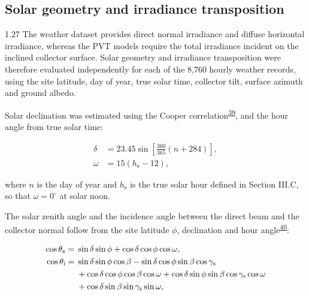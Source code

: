 \documentclass[12pt,letterpaper]{article}
\newcommand{\done}{\ \textcolor{green!45!black}{$\checkmark$}} %
\DeclareRobustCommand{\citenum}[1]{\hyperlink{ref:#1}{#1}} %
\begin{document}
\subsection[Solar geometry and irradiance transposition\done]{Solar geometry and irradiance transposition}\label{sec21}

\begin{spacing}{1.27}
The weather dataset provides direct normal irradiance and diffuse horizontal irradiance, whereas the PVT models require the total irradiance incident on the inclined collector surface. Solar geometry and irradiance transposition were therefore evaluated independently for each of the 8,760 hourly weather records, using the site latitude, day of year, true solar time, collector tilt, surface azimuth and ground albedo.\par

\vspace{0.15in}

Solar declination was estimated using the Cooper correlation\textsuperscript{\citenum{39}}, and the hour angle from true solar time:

\begin{align}
\delta &= 23.45 \sin\left[\frac{360}{365}\left(n+284\right)\right], \label{eq:declination}\\
\omega &= 15\left(h_{\mathrm{s}}-12\right), \label{eq:hourangle}
\end{align}

\noindent where $n$ is the day of year and $h_{\mathrm{s}}$ is the true solar hour defined in Section III.C, so that $\omega=0^\circ$ at solar noon.\par

\vspace{0.15in}

The solar zenith angle and the incidence angle between the direct beam and the collector normal follow from the site latitude $\phi$, declination and hour angle\textsuperscript{\citenum{40}}:

\begin{align}
\cos\theta_{\mathrm{z}} ={}& \sin\delta\sin\phi + \cos\delta\cos\phi\cos\omega, \label{eq:zenith}\\
\cos\theta_{\mathrm{i}} ={}& \sin\delta\sin\phi\cos\beta -\sin\delta\cos\phi\sin\beta\cos\gamma_{\mathrm{s}} \notag\\
&+\cos\delta\cos\phi\cos\beta\cos\omega +\cos\delta\sin\phi\sin\beta\cos\gamma_{\mathrm{s}}\cos\omega \notag\\
&+\cos\delta\sin\beta\sin\gamma_{\mathrm{s}}\sin\omega, \label{eq:incidence}
\end{align}


\end{spacing}
\end{document}
